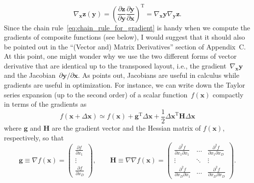 \documentclass[12pt,a4paper]{article}
\begin{document}
\begin{equation}
\nabla_{\mathbf{x}} \mathbf{z}(\mathbf{y}) =
\left(
  \frac{\partial\mathbf{z}}{\partial\mathbf{y}}
  \frac{\partial\mathbf{y}}{\partial\mathbf{x}}
\right)^{\operatorname{T}} =
\nabla_\mathbf{x} \mathbf{y} \nabla_\mathbf{y} \mathbf{z}.
\label{eq:chain_rule_for_gradient}
\end{equation}
Since the chain rule~\eqref{eq:chain_rule_for_gradient} is handy
when we compute the gradients of composite functions (see below),
I would suggest that it should also be pointed out in
the ``(Vector and) Matrix Derivatives'' section of Appendix~C.
At this point,
one might wonder why we use the two different forms of vector derivative that are identical
up to the transposed layout, i.e.,
the gradient~$\nabla_{\mathbf{x}} \mathbf{y}$ and
the Jacobian~$\partial\mathbf{y}/\partial\mathbf{x}$.
As \citet{Minka:OldNewMatrixAlgebra} points out,
Jacobians are useful in calculus while gradients are useful in optimization.
For instance, we can write down the Taylor series expansion
(up to the second order) of a scalar function~$f(\mathbf{x})$ compactly
in terms of the gradients as
\begin{equation}
f(\mathbf{x} + \Delta\mathbf{x}) \simeq
f(\mathbf{x})
+ \mathbf{g}^{\operatorname{T}} \Delta\mathbf{x}
+ \frac{1}{2} {\Delta\mathbf{x}}^{\operatorname{T}} \mathbf{H} \Delta\mathbf{x}
\end{equation}
where $\mathbf{g}$ and $\mathbf{H}$ are the gradient vector and the Hessian matrix of
$f(\mathbf{x})$, respectively, so that
\begin{equation}
\mathbf{g} \equiv \nabla f(\mathbf{x}) =
\begin{pmatrix}
\frac{\partial f}{\partial x_{1}} \\
\vdots \\
\frac{\partial f}{\partial x_{D}}
\end{pmatrix} , \qquad
\mathbf{H} \equiv \nabla\nabla f(\mathbf{x}) =
\begin{pmatrix}
\frac{\partial^{2} f}{\partial x_{1} \partial x_{1}} &
\hdots &
\frac{\partial^{2} f}{\partial x_{1} \partial x_{D}} \\
\vdots & \ddots & \vdots \\
\frac{\partial^{2} f}{\partial x_{D} \partial x_{1}} &
\hdots &
\frac{\partial^{2} f}{\partial x_{D} \partial x_{D}}
\end{pmatrix} .
\end{equation}
\end{document}

